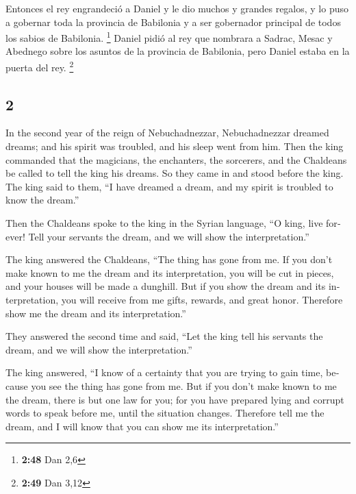 \begin{paracol}{2}
 Entonces el rey engrandeció a Daniel y le dio muchos y
grandes regalos, y lo puso a gobernar toda la provincia de Babilonia y a
ser gobernador principal de todos los sabios de Babilonia. \footnote{\textbf{2:48}
  Dan 2,6}  Daniel pidió al rey que nombrara a Sadrac,
Mesac y Abednego sobre los asuntos de la provincia de Babilonia, pero
Daniel estaba en la puerta del rey. \footnote{\textbf{2:49} Dan 3,12}

\switchcolumn
\begin{otherlanguage}{english}

\hypertarget{section-3}{%
\section{2}\label{section-3}}

 In the second year of the reign of Nebuchadnezzar,
Nebuchadnezzar dreamed dreams; and his spirit was troubled, and his
sleep went from him.  Then the king commanded that the
magicians, the enchanters, the sorcerers, and the Chaldeans be called to
tell the king his dreams. So they came in and stood before the king.
 The king said to them, ``I have dreamed a dream, and my
spirit is troubled to know the dream.''

 Then the Chaldeans spoke to the king in the Syrian
language, ``O king, live forever! Tell your servants the dream, and we
will show the interpretation.''

 The king answered the Chaldeans, ``The thing has gone
from me. If you don't make known to me the dream and its interpretation,
you will be cut in pieces, and your houses will be made a dunghill.
 But if you show the dream and its interpretation, you
will receive from me gifts, rewards, and great honor. Therefore show me
the dream and its interpretation.''

 They answered the second time and said, ``Let the king
tell his servants the dream, and we will show the interpretation.''

 The king answered, ``I know of a certainty that you are
trying to gain time, because you see the thing has gone from me.
 But if you don't make known to me the dream, there is but
one law for you; for you have prepared lying and corrupt words to speak
before me, until the situation changes. Therefore tell me the dream, and
I will know that you can show me its interpretation.''


\end{otherlanguage}
\end{paracol}
